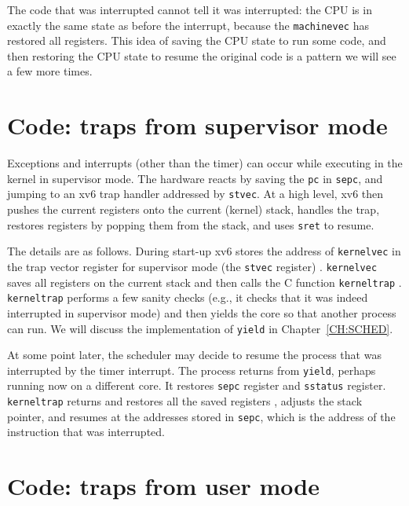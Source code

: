 The code that was interrupted cannot tell it was interrupted: the
CPU is in exactly the same state as before the interrupt,
because the \lstinline{machinevec} has restored all registers.  This
idea of saving the CPU state to run some code, and then
restoring the CPU state to resume the original code is a pattern
we will see a few more times.

\section{Code: traps from supervisor mode}

Exceptions and interrupts (other than the timer) can occur while
executing in the kernel in supervisor mode. The hardware reacts by
saving the {\tt pc} in {\tt sepc}, and jumping to an xv6 trap handler
addressed by {\tt stvec}. At a high level, xv6 then pushes the current
registers onto the current (kernel) stack, handles the trap, restores
registers by popping them from the stack, and uses {\tt sret} to resume.

The details are as follows. During start-up xv6 stores the address of
\lstinline{kernelvec} in the trap vector register for supervisor mode
(the \lstinline{stvec} register)
.  \lstinline{kernelvec} saves
all registers on the current stack
and then calls the C function \lstinline{kerneltrap}
.  \lstinline{kerneltrap}
 performs a few sanity checks
(e.g., it checks that it was indeed interrupted in supervisor mode) and
then yields the core so that another process can run.  We will discuss
the implementation of \lstinline{yield} in Chapter~\ref{CH:SCHED}.

At some point later, the scheduler may decide to resume the process
that was interrupted by the timer interrupt. The process returns from
\lstinline{yield}, perhaps running now on a different core.  It
restores \lstinline{sepc} register and \lstinline{sstatus} register.
\lstinline{kerneltrap} returns and restores all the saved registers
, adjusts the stack
pointer, and resumes at the addresses stored in \lstinline{sepc},
which is the address of the instruction that was interrupted.

\section{Code: traps from user mode}

